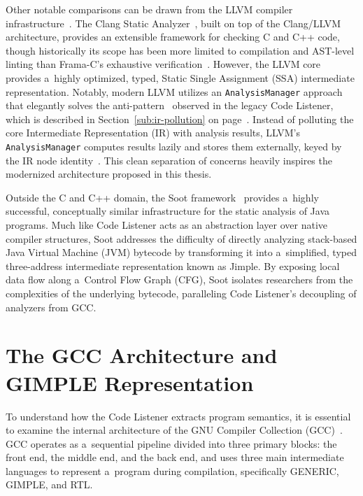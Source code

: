 \documentclass[xpsejal00-gcc-plugin.tex]{subfiles}
\begin{document}
Other notable comparisons can be drawn from the LLVM compiler infrastructure~\cite{LLVM}.
The Clang Static Analyzer~\cite{ClangStaticAnalyzer}, built on top of the Clang/LLVM architecture, provides an extensible framework for checking C and C++ code, though historically its scope has been more limited to compilation and AST-level linting than Frama-C's exhaustive verification~\cite{FramaC2015}.
However, the LLVM core provides a~highly optimized, typed, Static Single Assignment (SSA) intermediate representation.
Notably, modern LLVM utilizes an \texttt{AnalysisManager} approach that elegantly solves the  anti-pattern~\cite{Refactoring} observed in the legacy Code Listener, which is described in Section~\ref{sub:ir-pollution} on page~\pageref{sub:ir-pollution}.
Instead of polluting the core Intermediate Representation (IR) with analysis results, LLVM's \texttt{AnalysisManager} computes results lazily and stores them externally, keyed by the IR node identity~\cite{LLVMCompilationFramework}.
This clean separation of concerns heavily inspires the modernized architecture proposed in this thesis.

Outside the C and C++ domain, the Soot framework~\cite{SootFramework2011} provides a~highly successful, conceptually similar infrastructure for the static analysis of Java programs.
Much like Code Listener acts as an abstraction layer over native compiler structures, Soot addresses the difficulty of directly analyzing stack-based Java Virtual Machine (JVM) bytecode by transforming it into a~simplified, typed three-address intermediate representation known as Jimple.
By exposing local data flow along a~Control Flow Graph (CFG), Soot isolates researchers from the complexities of the underlying bytecode, paralleling Code Listener's decoupling of analyzers from GCC.

\section{The GCC Architecture and GIMPLE Representation}\label{sec:gcc-gimple}

To understand how the Code Listener extracts program semantics, it is essential to examine the internal architecture of the GNU Compiler Collection (GCC)~\cite{GCCInternals}.
GCC operates as a~sequential pipeline divided into three primary blocks: the front end, the middle end, and the back end, and uses three main intermediate languages to represent a~program during compilation, specifically GENERIC, GIMPLE, and RTL.
\end{document}
